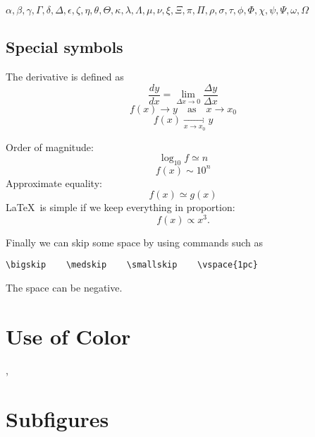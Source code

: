 \documentclass[12pt]{article}
\begin{document}
$\alpha, 
\beta, \gamma, \Gamma,
\delta,\Delta,
\epsilon, \zeta, \eta, \theta, \Theta, \kappa,
\lambda, \Lambda, \mu, \nu,
\xi, \Xi,
\pi, \Pi,
\rho,
\sigma, 
\tau,
\phi, \Phi,
\chi,
\psi, \Psi,
\omega, \Omega$

\subsection{Special symbols}

The derivative is defined as
\begin{equation}
  \frac{dy}{dx} = \lim_{\Delta x \to 0} \frac{\Delta y}
  {\Delta x}
\end{equation}
\begin{equation}
  f(x) \to y \quad \mbox{as} \quad x \to
  x_{0}
\end{equation}
\begin{equation}
  f(x) \mathop {\longrightarrow}
  \limits_{x \to x_0} y
\end{equation}

\noindent Order of magnitude:
\begin{equation}
  \log_{10}f \simeq n
\end{equation}
\begin{equation}
  f(x)\sim 10^{n}
\end{equation}
Approximate equality:
\begin{equation}
  f(x)\simeq g(x)
\end{equation}
\LaTeX\ is simple if we keep everything in proportion:
\begin{equation}
  f(x) \propto x^3 .
\end{equation}

Finally we can skip some space by using commands such as
\begin{verbatim}
\bigskip    \medskip    \smallskip    \vspace{1pc}
\end{verbatim}
The space can be negative.

\section{\color{red}Use of Color}

{\color{blue}{We can change colors for emphasis}},
{\color{green}{but}} {\color{cyan}{who is going pay for the ink?}}

\section{\label{morefig}Subfigures}
\end{document}
